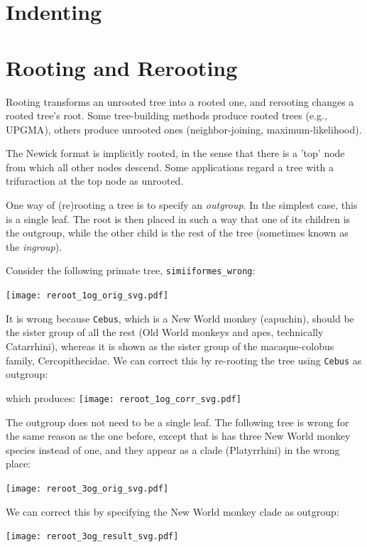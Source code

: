\documentclass[a4paper,10pt]{report}
\theoremstyle{definition}
\begin{document}
\section{Indenting}
\label{sct_indent}

\section{Rooting and Rerooting}
\label{sct_reroot}

Rooting transforms an unrooted tree into a rooted one, and rerooting changes a rooted tree's root. Some tree-building methods produce rooted trees (e.g., \textsc{UPGMA}), others produce unrooted ones (neighbor-joining, maximum-likelihood). 

The Newick format is implicitly rooted, in the sense that there is a 'top' node from which all other nodes descend. Some applications regard a tree with a trifuraction at the top node as unrooted. 

One way of (re)rooting a tree is to specify an \textit{outgroup}. In the simplest case, this is a single leaf. The root is then placed in such a way that one of its children is the outgroup, while the other child is the rest of the tree (sometimes known as the \textit{ingroup}). 

Consider the following primate tree, \texttt{simiiformes\_wrong}:

\texttt{[image: reroot\_1og\_orig\_svg.pdf]}

\noindent{}It is wrong because \texttt{Cebus}, which is a New World monkey (capuchin), should be the sister group of all the rest (Old World monkeys and apes, technically Catarrhini), whereas it is shown as the sister group of the macaque-colobus family, Cercopithecidae. We can correct this by re-rooting the tree using \texttt{Cebus} as outgroup:

which produces:
\texttt{[image: reroot\_1og\_corr\_svg.pdf]}

The outgroup does not need to be a single leaf. The following tree is wrong for the same reason as the one before, except that is has three New World monkey species instead of one, and they appear as a clade (Platyrrhini) in the wrong place:

\texttt{[image: reroot\_3og\_orig\_svg.pdf]}

\noindent{}We can correct this by specifying the New World monkey clade as outgroup:



\texttt{[image: reroot\_3og\_result\_svg.pdf]}
\end{document}
